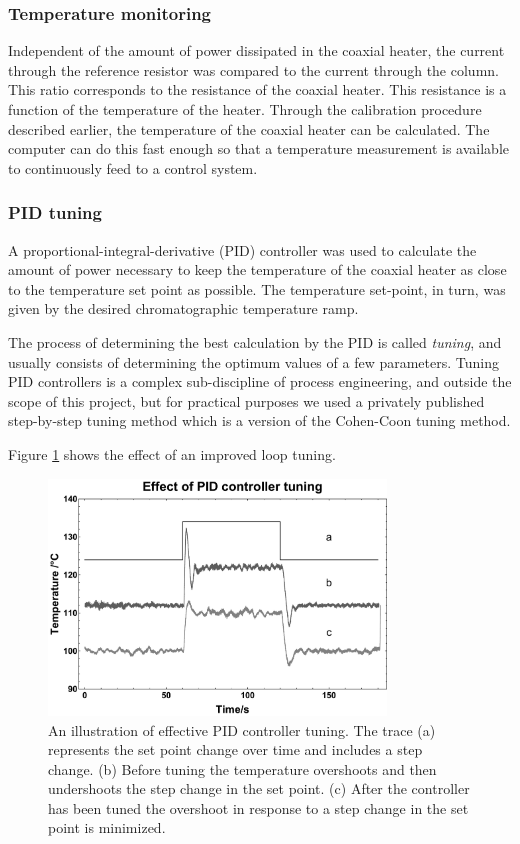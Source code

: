 \subsubsection{Temperature monitoring}

Independent of the amount of power dissipated in the coaxial heater, the current
through the reference resistor was compared to the current through the column.
This ratio corresponds to the resistance of the coaxial heater. This resistance
is a function of the temperature of the heater. Through the calibration
procedure described earlier, the temperature of the coaxial heater can be
calculated. The computer can do this fast enough so that a temperature
measurement is available to continuously feed to a control system. 

\subsubsection{PID tuning}

A proportional-integral-derivative (PID) controller was used to calculate the
amount of power necessary to keep the temperature of the coaxial heater as close
to the temperature set point as possible. The temperature set-point, in turn,
was given by the desired chromatographic temperature ramp.

The process of determining the best calculation by the PID is called
\textit{tuning}, and usually consists of determining the optimum values of a few
parameters. Tuning PID controllers is a complex sub-discipline of process
engineering, and outside the scope of this project, but for practical purposes
we used a privately published step-by-step tuning method \autocite{Peacock2008}
which is a version of the Cohen-Coon tuning method.

Figure \ref{fig:LoopTuning} shows the effect of an improved loop tuning. 

\begin{figure}
	\centering
	\includegraphics[width=0.8\textwidth]{Figures/LoopTuningGraph.pdf}
	\decoRule	
	\caption[Effect of controller tuning]{An illustration of effective PID
	controller tuning. The trace (a) represents the set point change over time and
	includes a step change. (b) Before tuning the temperature overshoots and then
	undershoots the step change in the set point. (c) After the controller has been
	tuned the overshoot in response to a step change in the set point is minimized. }
	\label{fig:LoopTuning} 
\end{figure}

